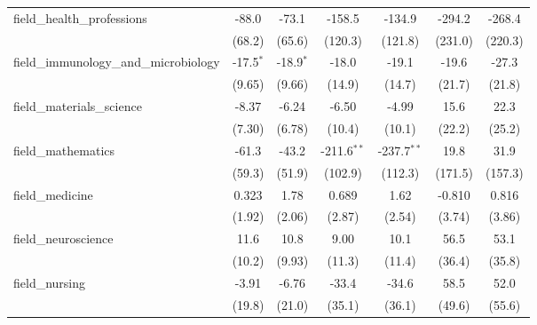 \begin{tabular}{lcccccc}
   field\_health\_professions                                  & -88.0         & -73.1       & -158.5         & -134.9        & -294.2       & -268.4\\   
                                                               & (68.2)        & (65.6)      & (120.3)        & (121.8)       & (231.0)      & (220.3)\\   
   field\_immunology\_and\_microbiology                        & -17.5$^{*}$   & -18.9$^{*}$ & -18.0          & -19.1         & -19.6        & -27.3\\   
                                                               & (9.65)        & (9.66)      & (14.9)         & (14.7)        & (21.7)       & (21.8)\\   
   field\_materials\_science                                   & -8.37         & -6.24       & -6.50          & -4.99         & 15.6         & 22.3\\   
                                                               & (7.30)        & (6.78)      & (10.4)         & (10.1)        & (22.2)       & (25.2)\\   
   field\_mathematics                                          & -61.3         & -43.2       & -211.6$^{**}$  & -237.7$^{**}$ & 19.8         & 31.9\\   
                                                               & (59.3)        & (51.9)      & (102.9)        & (112.3)       & (171.5)      & (157.3)\\   
   field\_medicine                                             & 0.323         & 1.78        & 0.689          & 1.62          & -0.810       & 0.816\\   
                                                               & (1.92)        & (2.06)      & (2.87)         & (2.54)        & (3.74)       & (3.86)\\   
   field\_neuroscience                                         & 11.6          & 10.8        & 9.00           & 10.1          & 56.5         & 53.1\\   
                                                               & (10.2)        & (9.93)      & (11.3)         & (11.4)        & (36.4)       & (35.8)\\   
   field\_nursing                                              & -3.91         & -6.76       & -33.4          & -34.6         & 58.5         & 52.0\\   
                                                               & (19.8)        & (21.0)      & (35.1)         & (36.1)        & (49.6)       & (55.6)\\   

\end{tabular}
